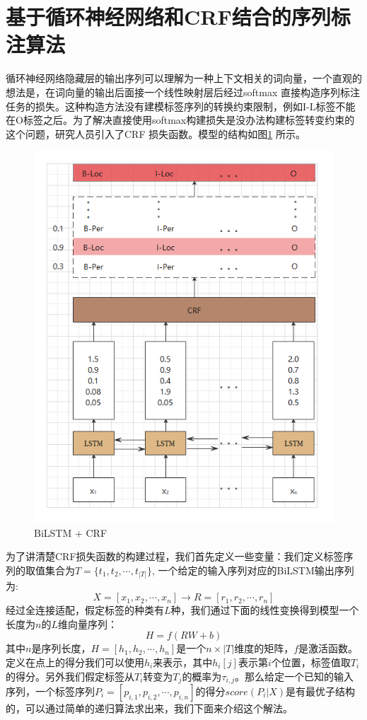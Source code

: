 \documentclass[twoside,a4paper,12pt]{book}%
\begin{document}
\section{基于循环神经网络和CRF结合的序列标注算法}
循环神经网络隐藏层的输出序列可以理解为一种上下文相关的词向量，一个直观的想法是，在词向量的输出后面接一个线性映射层后经过softmax 直接构造序列标注任务的损失。这种构造方法没有建模标签序列的转换约束限制，例如I-L标签不能在O标签之后。为了解决直接使用softmax构建损失是没办法构建标签转变约束的这个问题，研究人员引入了\gls{CRF} 损失函数。模型的结构如图\ref{fig:bilstm-crf1} 所示。
\begin{figure}[htbp]
\begin{center}
\includegraphics[width=5.6in]{figures/bilstm-crf1.png}
\caption{BiLSTM + CRF}
\label{fig:bilstm-crf1}
\end{center}
\end{figure}

为了讲清楚\gls{CRF}损失函数的构建过程，我们首先定义一些变量：我们定义标签序列的取值集合为$T=\{t_1,t_2,\cdots,t_{|T|}\}$, 一个给定的输入序列对应的BiLSTM输出序列为:
$$
X=[x_1,x_2,\cdots,x_n] \rightarrow R=[r_1,r_2,\cdots,r_n]
$$经过全连接适配，假定标签的种类有$L$种，我们通过下面的线性变换得到模型一个长度为$n$的$L$维向量序列：
$$
H=f(RW+b)
$$
其中$n$是序列长度，$H=[h_1,h_2,\cdots,h_n]$是一个$n\times|T|$维度的矩阵，$f$是激活函数。定义在点上的得分我们可以使用$h_i$来表示，其中$h_i[j]$表示第$i$个位置，标签值取$T_i$的得分。另外我们假定标签从$T_i$转变为$T_j$的概率为$\tau_{i,j}$。那么给定一个已知的输入序列，一个标签序列$P_i=[p_{i,1},p_{i,2},\cdots,p_{i,n}]$的得分$score(P_i|X)$是有最优子结构的，可以通过简单的递归算法求出来，我们下面来介绍这个解法。
\end{document}
